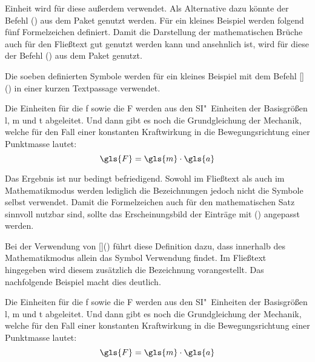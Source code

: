 \documentclass[%
  english,ngerman,%
  cdgeometry=no,DIV=12,%
  automark,%
  listof=toc,%
]{tudscrartcl}
\begin{document}
Einheit wird für diese außerdem  verwendet. Als Alternative dazu 
könnte der Befehl () aus dem Paket  
genutzt werden. Für ein kleines Beispiel werden folgend fünf Formelzeichen 
definiert. Damit die Darstellung der mathematischen Brüche auch für den 
Fließtext gut genutzt werden kann und ansehnlich ist, wird für diese der Befehl 
() aus dem Paket  genutzt.
%
\begin{Trunk*}

\end{Trunk*}
%
Die soeben definierten Symbole werden für ein kleines Beispiel mit dem Befehl 
[]() in einer kurzen 
Textpassage verwendet.
%
\begin{Hint*}
Die Einheiten für die \gls{f} sowie die \gls{F} werden aus den 
SI"~Einheiten der Basisgrößen \gls{l}, \gls{m} und \gls{t} abgeleitet.
Und dann gibt es noch die Grundgleichung der Mechanik, welche für den
Fall einer konstanten Kraftwirkung in die Bewegungsrichtung einer
Punktmasse lautet:
\[\gls{F} = \gls{m} \cdot \gls{a}\]
\end{Hint*}
%
Das Ergebnis ist nur bedingt befriedigend. Sowohl im Fließtext als auch im 
Mathematikmodus werden lediglich die Bezeichnungen jedoch nicht die Symbole 
selbst verwendet. Damit die Formelzeichen auch für den mathematischen Satz 
sinnvoll nutzbar sind, sollte das Erscheinungsbild der Einträge mit 
() angepasst werden.
%
\begin{Preamble*}
\end{Preamble*}
%
Bei der Verwendung von []() 
führt diese Definition dazu, dass innerhalb des Mathematikmodus allein das 
Symbol Verwendung findet. Im Fließtext hingegeben wird diesem zusätzlich die 
Bezeichnung vorangestellt. Das nachfolgende Beispiel macht dies deutlich.
%
\begin{Trunk*}
Die Einheiten für die \gls{f} sowie die \gls{F} werden aus den
SI"~Einheiten der Basisgrößen \gls{l}, \gls{m} und \gls{t} abgeleitet.
Und dann gibt es noch die Grundgleichung der Mechanik, welche für den
Fall einer konstanten Kraftwirkung in die Bewegungsrichtung einer
Punktmasse lautet:
\[\gls{F} = \gls{m} \cdot \gls{a}\]

\end{Trunk*}
\end{document}
